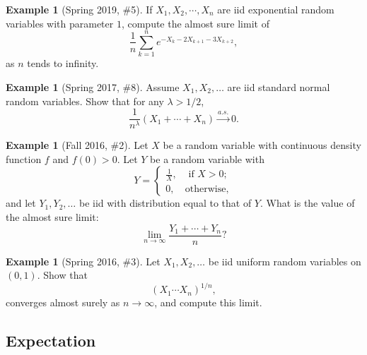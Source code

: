\documentclass[12pt,reqno]{article}
\theoremstyle{plain}
\theoremstyle{definition}
\newtheorem{example}[theorem]{Example}
\begin{document}
\begin{example}[Spring 2019, \#5]
If $X_1,X_2,\cdots,X_n$ are iid exponential random variables with parameter $1$, 
compute the almost sure limit of 
\[
\frac{1}{n} \sum_{k=1}^n e^{-X_k-2X_{k+1}-3X_{k+2}}, 
\]
as $n$ tends to infinity. 
\end{example} 

\begin{example}[Spring 2017, \#8] 
Assume $X_1,X_2,\ldots$ are iid standard normal random variables. 
Show that for any $\lambda > 1/2$, 
\[
\frac{1}{n^{\lambda}}(X_1+\cdots+X_n) \xrightarrow{a.s.} 0. 
\]
\end{example} 

\begin{example}[Fall 2016, \#2]
Let $X$ be a random variable with continuous density function $f$ and 
$f(0) > 0$. Let $Y$ be a random variable with 
\[
Y = \begin{cases} \frac{1}{X}, & \text{ if $X > 0$; } \\ 0, & 
     \text{otherwise,} \end{cases}
\]
and let $Y_1,Y_2,\ldots$ be iid with distribution equal to that of $Y$. 
What is the value of the almost sure limit:
\[
\lim_{n \rightarrow \infty} \frac{Y_1+\cdots+Y_n}{n}?
\]
\end{example} 

\begin{example}[Spring 2016, \#3]
Let $X_1,X_2,\ldots$ be iid uniform random variables on $(0,1)$. Show that 
\[
(X_1 \cdots X_n)^{1/n}, 
\]
converges almost surely as $n \rightarrow \infty$, and compute this limit. 
\end{example} 

\subsection{Expectation} 
\end{document}
